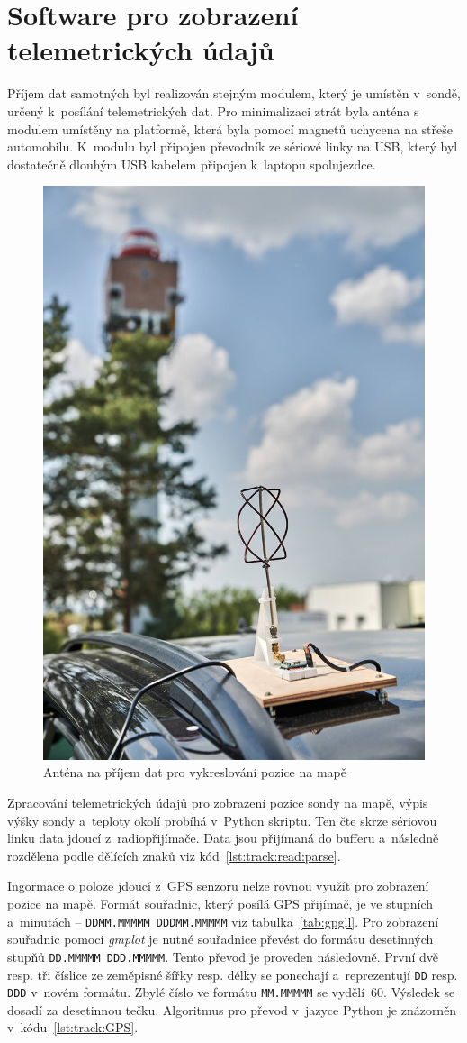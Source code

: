 \documentclass[twoside]{ctuthesis}
\theoremstyle{plain}
\theoremstyle{definition}
\theoremstyle{note}
\begin{document}
	\section{Software pro zobrazení telemetrických údajů}
	Příjem dat samotných byl realizován stejným modulem, který je umístěn v~sondě, určený k~posílání telemetrických dat. Pro minimalizaci ztrát byla anténa s modulem umístěny na platformě, která byla pomocí magnetů uchycena na střeše automobilu. K~modulu byl připojen převodník ze sériové linky na USB, který byl dostatečně dlouhým USB kabelem připojen k~laptopu spolujezdce.

	\begin{figure}
		\centering
		\includegraphics[width=.4\textwidth]{Figures/antena_auto.jpeg}
		\caption{Anténa na příjem dat pro vykreslování pozice na mapě}
		\label{fig:auto:antena}
	\end{figure}


	Zpracování telemetrických údajů pro zobrazení pozice sondy na mapě, výpis výšky sondy a~teploty okolí probíhá v~Python skriptu. Ten čte skrze sériovou linku data jdoucí z~radiopřijímače. Data jsou přijímaná do bufferu a~následně rozdělena podle dělících znaků viz kód~\ref{lst:track:read:parse}.
	

	Ingormace o poloze jdoucí z~GPS senzoru nelze rovnou využít pro zobrazení pozice na mapě. Formát souřadnic, který posílá GPS přijímač, je ve stupních a~minutách -- \lstinline|DDMM.MMMMM DDDMM.MMMMM| viz tabulka~\ref{tab:gpgll}. Pro zobrazení souřadnic pomocí \textit{gmplot} je nutné souřadnice převést do formátu desetinných stupňů \lstinline|DD.MMMMM DDD.MMMMM|. Tento převod je proveden následovně. První dvě resp. tři číslice ze zeměpisné šířky resp. délky se ponechají a~reprezentují \lstinline|DD| resp. \lstinline|DDD| v~novém formátu. Zbylé číslo ve formátu \lstinline|MM.MMMMM| se vydělí~60. Výsledek se dosadí za desetinnou tečku. Algoritmus pro převod v~jazyce Python je znázorněn v~kódu~\ref{lst:track:GPS}.
\end{document}
